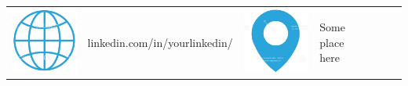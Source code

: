 \documentclass[a4paper,10pt]{article}
\newcommand\Tstrut{\rule{0pt}{3ex}}         %
\newcommand\Bstrut{\rule[-1.5ex]{0pt}{0pt}}   %
\begin{document}
\begin{table}[H]
\begin{tabular}{r l | r l | r l | r l}
 \includegraphics[scale=0.015]{icons/url.jpeg} \hspace{-1.3em} & linkedin.com/in/yourlinkedin/ & 
 \includegraphics[scale=0.015]{icons/location.jpeg} \hspace{-1.3em} & Some place here \Tstrut\Bstrut\\
\end{tabular}

\vspace{-2.5em}
\noindent\hrulefill
\vspace{1em}

\end{table}
\end{document}
